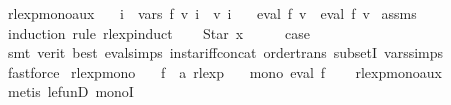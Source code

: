 \begin{isabellebody}
%
\endisatagdocument
{\isafolddocument}%
%
\isadelimdocument
%
\endisadelimdocument
{}\isamarkupfalse%
\ rlexp{\isacharunderscore}{\kern0pt}mono{\isacharunderscore}{\kern0pt}aux{\isacharcolon}{\kern0pt}\isanewline
\ \ \ {\isachardoublequoteopen}{\isasymforall}i\ {\isasymin}\ vars\ f{\isachardot}{\kern0pt}\ v\ i\ {\isasymsubseteq}\ v{\isacharprime}{\kern0pt}\ i{\isachardoublequoteclose}\isanewline
\ \ \ {\isachardoublequoteopen}eval\ f\ v\ {\isasymsubseteq}\ eval\ f\ v{\isacharprime}{\kern0pt}{\isachardoublequoteclose}\isanewline
%
\isadelimproof
%
\endisadelimproof
%
\isatagproof
{}\isamarkupfalse%
\ assms\ \isamarkupfalse%
\ {\isacharparenleft}{\kern0pt}induction\ rule{\isacharcolon}{\kern0pt}\ rlexp{\isachardot}{\kern0pt}induct{\isacharparenright}{\kern0pt}\isanewline
\ \ \isamarkupfalse%
\ {\isacharparenleft}{\kern0pt}Star\ x{\isacharparenright}{\kern0pt}\isanewline
\ \ \isamarkupfalse%
\ \isamarkupfalse%
\ {\isacharquery}{\kern0pt}case\isanewline
\ \ \ \ \isamarkupfalse%
\ {\isacharparenleft}{\kern0pt}smt\ {\isacharparenleft}{\kern0pt}verit{\isacharcomma}{\kern0pt}\ best{\isacharparenright}{\kern0pt}\ eval{\isachardot}{\kern0pt}simps{\isacharparenleft}{\kern0pt}{}{\isacharparenright}{\kern0pt}\ in{\isacharunderscore}{\kern0pt}star{\isacharunderscore}{\kern0pt}iff{\isacharunderscore}{\kern0pt}concat\ order{\isacharunderscore}{\kern0pt}trans\ subsetI\ vars{\isachardot}{\kern0pt}simps{\isacharparenleft}{\kern0pt}{}{\isacharparenright}{\kern0pt}{\isacharparenright}{\kern0pt}\isanewline
{}\isamarkupfalse%
\ fastforce{\isacharplus}{\kern0pt}%
\endisatagproof
{\isafoldproof}%
%
\isadelimproof
\isanewline
%
\endisadelimproof
\isanewline
{}\isamarkupfalse%
\ rlexp{\isacharunderscore}{\kern0pt}mono{\isacharcolon}{\kern0pt}\isanewline
\ \ \ f\ {\isacharcolon}{\kern0pt}{\isacharcolon}{\kern0pt}\ {\isachardoublequoteopen}{\isacharprime}{\kern0pt}a\ rlexp{\isachardoublequoteclose}\isanewline
\ \ \ {\isachardoublequoteopen}mono\ {\isacharparenleft}{\kern0pt}eval\ f{\isacharparenright}{\kern0pt}{\isachardoublequoteclose}\isanewline
%
\isadelimproof
\ \ %
\endisadelimproof
%
\isatagproof
{}\isamarkupfalse%
\ rlexp{\isacharunderscore}{\kern0pt}mono{\isacharunderscore}{\kern0pt}aux\ \isamarkupfalse%
\ {\isacharparenleft}{\kern0pt}metis\ le{\isacharunderscore}{\kern0pt}funD\ monoI{\isacharparenright}{\kern0pt}%

\end{isabellebody}
